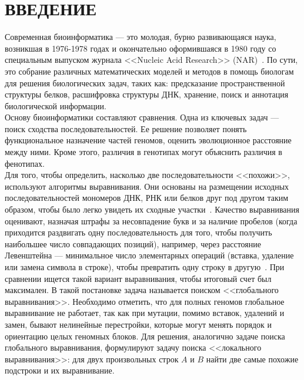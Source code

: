 \newpage
\part*{\large \centering ВВЕДЕНИЕ}
\hspace{\parindent} Современная биоинформатика --- это молодая, бурно развивающаяся наука, возникшая в 1976-1978 годах и окончательно оформившаяся в 1980 году со специальным выпуском журнала <<Nucleic Acid Research>> (NAR)~\cite{MironovLect}. По сути, это собрание различных математических моделей и методов в помощь биологам для решения биологических задач, таких как: предсказание пространственной структуры белков, расшифровка структуры ДНК, хранение, поиск и аннотация биологической информации.\\
\indent Основу биоинформатики составляют сравнения. Одна из ключевых задач --- поиск сходства последовательностей. Ее решение позволяет понять функциональное назначение частей геномов, оценить эволюционное расстояние между ними. Кроме этого, различия в генотипах могут объяснить различия в фенотипах.\\
\indent Для того, чтобы определить, насколько две последовательности <<похожи>>, используют алгоритмы выравнивания. Они основаны на размещении исходных последовательностей мономеров ДНК, РНК или белков друг под другом таким образом, чтобы было легко увидеть их сходные участки~\cite{WikiPairAlign}. Качество выравнивания оценивают, назначая штрафы за несовпадение букв и за наличие пробелов (когда приходится раздвигать одну последовательность для того, чтобы получить наибольшее число совпадающих позиций), например, через расстояние Левенштейна --- минимальное число элементарных операций (вставка, удаление или замена символа в строке), чтобы превратить одну строку в другую~\cite{Levenshtein}. При сравнении ищется такой вариант выравнивания, чтобы итоговый счет был максимален. В такой постановке задача называется поиском <<глобального выравнивания>>. Необходимо отметить, что для полных геномов глобальное выравнивание не работает, так как при мутации, помимо вставок, удалений и замен, бывают нелинейные перестройки, которые могут менять порядок и ориентацию целых геномных блоков. Для решения, аналогично задаче поиска глобального выравнивания, формулируют задачу поиска <<локального выравнивания>>: для двух произвольных строк $A$ и $B$ найти две самые похожие подстроки и их выравнивание.\\ 
